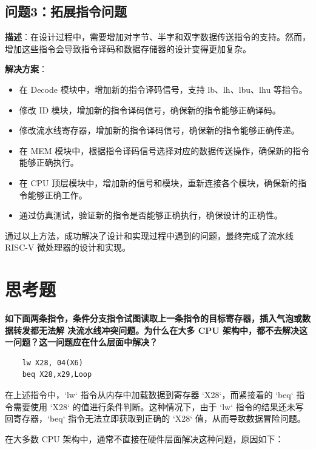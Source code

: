 \documentclass[12pt,hyperref,a4paper,UTF8]{ctexart}
\begin{document}
\subsection{问题3：拓展指令问题}

\textbf{描述}：在设计过程中，需要增加对字节、半字和双字数据传送指令的支持。然而，增加这些指令会导致指令译码和数据存储器的设计变得更加复杂。

\textbf{解决方案}：
\begin{itemize}
    \item 在 Decode 模块中，增加新的指令译码信号，支持 lb、lh、lbu、lhu 等指令。
    \item 修改 ID 模块，增加新的指令译码信号，确保新的指令能够正确译码。
    \item 修改流水线寄存器，增加新的指令译码信号，确保新的指令能够正确传递。
    \item 在 MEM 模块中，根据指令译码信号选择对应的数据传送操作，确保新的指令能够正确执行。
    \item 在 CPU 顶层模块中，增加新的信号和模块，重新连接各个模块，确保新的指令能够正确工作。
    \item 通过仿真测试，验证新的指令是否能够正确执行，确保设计的正确性。
\end{itemize}

通过以上方法，成功解决了设计和实现过程中遇到的问题，最终完成了流水线 RISC-V 微处理器的设计和实现。

\newpage

\section{思考题}

\textbf{如下面两条指令，条件分支指令试图读取上一条指令的目标寄存器，插入气泡或数据转发都无法解
决流水线冲突问题。为什么在大多 CPU 架构中，都不去解决这一问题？这一问题应在什么层面中解决？}
\begin{lstlisting}
    lw X28, 04(X6) 
    beq X28,x29,Loop
\end{lstlisting}

在上述指令中，`lw` 指令从内存中加载数据到寄存器 `X28`，而紧接着的 `beq` 指令需要使用 `X28` 的值进行条件判断。这种情况下，由于 `lw` 指令的结果还未写回寄存器，`beq` 指令无法立即获取到正确的 `X28` 值，从而导致数据冒险问题。

在大多数 CPU 架构中，通常不直接在硬件层面解决这种问题，原因如下：
\end{document}
